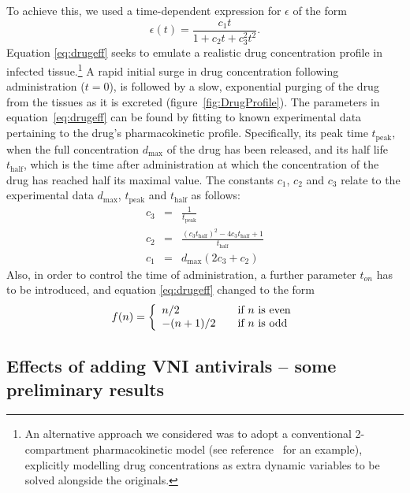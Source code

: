 \documentclass[a4paper, 12pt]{report}
\begin{document}
To achieve this, we used a time-dependent expression for $\epsilon$ of the form
\begin{equation}
\epsilon(t) = \frac{c_{1}t}{1 + c_{2}t+c_{3}^{2}t^{2}}. \label{eq:drugeff}
\end{equation}
Equation \eqref{eq:drugeff} seeks to emulate a realistic drug concentration profile in infected tissue.\footnote{An alternative approach we considered was to adopt a conventional 2-compartment pharmacokinetic model (see reference~\cite{Tsoukias} for an example), explicitly modelling drug concentrations as extra dynamic variables to be solved alongside the originals.}
A rapid initial surge in drug concentration following administration ($t = 0$), is followed by a slow, exponential purging of the drug from the tissues as it is excreted (figure~\ref{fig:DrugProfile}). The parameters in equation~\ref{eq:drugeff} can be found by fitting to known experimental data pertaining to the drug's pharmacokinetic profile.
Specifically, its peak time $t_{\textrm{peak}}$, when the full concentration $d_{\textrm{max}}$ of the drug has been released, and its half life $t_{\textrm{half}}$, which is the time after administration at which the concentration of the drug has reached half its maximal value. The constants $c_1$, $c_2$ and $c_3$ relate to the experimental data $d_{\textrm{max}}$, $t_{\textrm{peak}}$ and $t_{\textrm{half}}$ as follows:
\begin{eqnarray}
c_3 &=& \frac{1}{t_{\textrm{peak}}}\\
c_2 &=& \frac{(c_3 t_{\textrm{half}})^2 - 4 c_3 t_{\textrm{half}} + 1}{t_{\textrm{half}}}\\
c_1 &=& d_{\textrm{max}} (2 c_3 + c_2)
\end{eqnarray}
Also, in order to control the time of administration, a further parameter $t_{on}$ has to be introduced, and equation \eqref{eq:drugeff} changed to the form
\begin{equation}
f(n) = \left\{ 
   \begin{array}{l l}
     n/2 & \quad \text{if $n$ is even}\\
     -(n+1)/2 & \quad \text{if $n$ is odd}
   \end{array} \right.
\end{equation}

\subsection{Effects of adding VNI antivirals -- some preliminary results}
\end{document}
